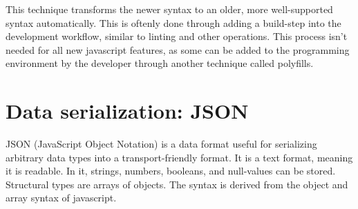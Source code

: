 This technique transforms the newer syntax to an older, more well-supported syntax automatically. This is oftenly done through adding a build-step into the development workflow, similar to linting and other operations. This process isn't needed for all new javascript features, as some can be added to the programming environment by the developer through another technique called polyfills. \cite[p. 4-5]{youdontknowjs}

\section{Data serialization: JSON}

JSON (JavaScript Object Notation) is a data format useful for serializing arbitrary data types into a transport-friendly format. It is a text format, meaning it is readable. In it, strings, numbers, booleans, and null-values can be stored. Structural types are arrays of objects. The syntax is derived from the object and array syntax of javascript. \cite{json}

